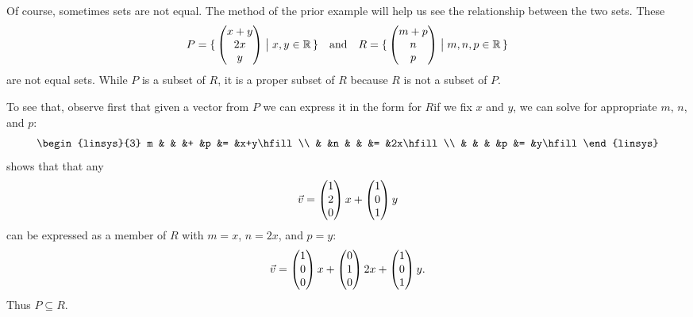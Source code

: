 \begin{example}
Of course, sometimes sets are not equal.
The method of the prior example will help us see the relationship
between the two sets.
These 
\begin{equation*}
  P=
  \mbox{$\{\,\begin{pmatrix} x+y \\ 2x \\ y \end{pmatrix}\bigm| x,y\in\mathbb{R}\,\}$}
  \quad\text{and}\quad
  R=
  \mbox{$\{\,\begin{pmatrix} m+p \\ n \\ p \end{pmatrix}\bigm| m,n,p\in\mathbb{R}\,\}$}
\end{equation*}
are not equal sets.
While $P$ is a subset of $R$, it is a proper subset of $R$ because
$R$ is not a subset of $P$.

To see that, observe first that given a vector from \( P \)
we can express it in the form for \( R \)\Dash if
we fix $x$ and $y$, we can solve for appropriate $m$, $n$, and $p$:
\begin{equation*}
  \begin{linsys}{3}
     m  &   &   &+  &p  &=  &x+y\hfill  \\
        &   &n  &   &   &=  &2x\hfill   \\
        &   &   &   &p  &=  &y\hfill    
  \end{linsys}
\end{equation*}
shows that that any
\begin{equation*}
  \vec{v}=
  \begin{pmatrix} 1 \\ 2 \\ 0 \end{pmatrix}x+
  \begin{pmatrix} 1 \\ 0 \\ 1 \end{pmatrix}y
\end{equation*}
can be expressed as a member of \( R \) with
\( m=x \), \( n=2x \), and \( p=y \):
\begin{equation*}
  \vec{v}=
  \begin{pmatrix} 1 \\ 0 \\ 0 \end{pmatrix}x+
  \begin{pmatrix} 0 \\ 1 \\ 0 \end{pmatrix}2x+
  \begin{pmatrix} 1 \\ 0 \\ 1 \end{pmatrix}y.
\end{equation*}
Thus \( P\subseteq R \).


\end{example}
